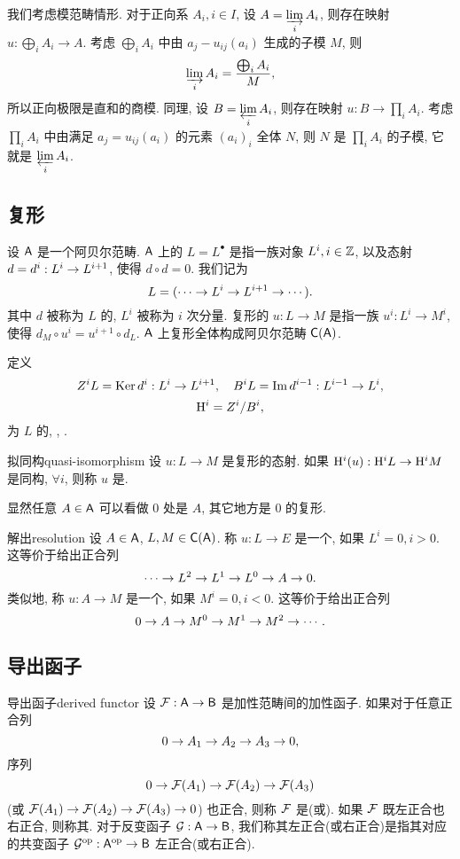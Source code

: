 我们考虑模范畴情形. 对于正向系 $A_i,i\in I$, 设 $A=\varinjlim\limits_i A_i$, 则存在映射 $u:\bigoplus_i A_i\to A$. 考虑 $\bigoplus_i A_i$ 中由 $a_j-u_{ij}(a_i)$ 生成的子模 $M$, 则
  \[\varinjlim\limits_i A_i=\frac{\bigoplus_i A_i}{M},\]
所以正向极限是直和的商模. 同理, 设 $B=\varprojlim\limits_i A_i$, 则存在映射 $u:B\to \prod_i A_i$. 考虑 $\prod_i A_i$ 中由满足 $a_j=u_{ij}(a_i)$ 的元素 $(a_i)_i$ 全体 $N$, 则 $N$ 是 $\prod_i A_i$ 的子模, 它就是 $\varprojlim\limits_i A_i$.

\subsection{复形}
设 ${\mathsf{A}}$ 是一个阿贝尔范畴. ${\mathsf{A}}$ 上的 $L=L^\bullet$ 是指一族对象 $L^i,i\in{\mathbb{Z}}$, 以及态射 $d=d^i:L^i\rightarrow L^{i+1}$, 使得 $d\circ d=0$. 我们记为
  \[L=(\cdots\rightarrow L^i\rightarrow L^{i+1}\rightarrow\cdots).\]
其中 $d$ 被称为 $L$ 的, $L^i$ 被称为 $i$ 次分量. 复形的 $u:L\to M$ 是指一族 $u^i:L^i\to M^i$, 使得 $d_M\circ u^i=u^{i+1}\circ d_L$. ${\mathsf{A}}$ 上复形全体构成阿贝尔范畴 ${\mathsf{C}}({\mathsf{A}})$.

定义
  \[Z^iL={\mathrm{Ker}\,} d^i:L^i\to L^{i+1},\quad B^iL={\mathrm{Im}\,} d^{i-1}:L^{i-1}\to L^i,\]
  \[{\mathrm{H}}^i=Z^i/B^i,\]
为 $L$ 的, , .

\begin{definition}{拟同构}{quasi-isomorphism}
设 $u:L\to M$ 是复形的态射. 
如果 ${\mathrm{H}}^i(u):{\mathrm{H}}^iL\to {\mathrm{H}}^iM$ 是同构, $\forall i$, 则称 $u$ 是.
\end{definition}

显然任意 $A\in {\mathsf{A}}$ 可以看做 $0$ 处是 $A$, 其它地方是 $0$ 的复形.

\begin{definition}{解出}{resolution}
设 $A\in{\mathsf{A}}$, $L,M\in{\mathsf{C}}({\mathsf{A}})$. 称 $u:L\to E$ 是一个, 如果 $L^i=0,i>0$. 这等价于给出正合列
  \[\cdots\rightarrow L^2\rightarrow L^1\rightarrow L^0\rightarrow A\rightarrow 0.\]
类似地, 称 $u:A\to M$ 是一个, 如果 $M^i=0,i<0$. 这等价于给出正合列
  \[0\rightarrow A\rightarrow M^0\rightarrow M^1\rightarrow M^2\rightarrow\cdots.\]
\end{definition}


\subsection{导出函子}

\begin{definition}{导出函子}{derived functor}
设 ${\mathcal{F}}:{\mathsf{A}}\to{\mathsf{B}}$ 是加性范畴间的加性函子. 如果对于任意正合列
  \[0\rightarrow A_1\rightarrow A_2\rightarrow A_3\rightarrow 0,\]
序列
  \[0\rightarrow{\mathcal{F}}(A_1)\rightarrow{\mathcal{F}}(A_2)\rightarrow {\mathcal{F}}(A_3)\]
(或 ${\mathcal{F}}(A_1)\rightarrow{\mathcal{F}}(A_2)\rightarrow {\mathcal{F}}(A_3)\rightarrow 0$) 也正合, 则称 ${\mathcal{F}}$ 是(或). 如果 ${\mathcal{F}}$ 既左正合也右正合, 则称其. 对于反变函子 ${\mathcal{G}}:{\mathsf{A}}\to {\mathsf{B}}$, 我们称其左正合(或右正合)是指其对应的共变函子 ${\mathcal{G}}^{\mathrm{op}}:{\mathsf{A}}^{\mathrm{op}}\to{\mathsf{B}}$ 左正合(或右正合).
\end{definition}

